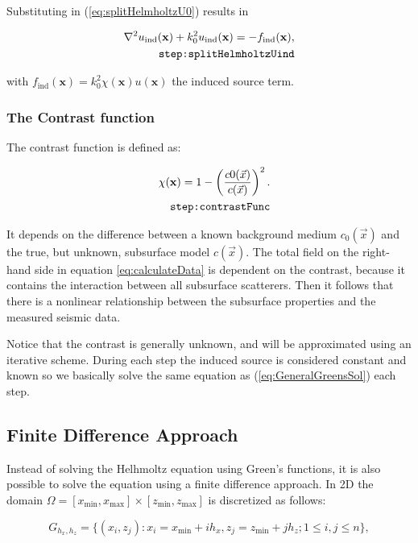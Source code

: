 \documentclass[10pt,a4paper]{article}
\begin{document}
Substituting in (\ref{eq:splitHelmholtzU0}) results in

\begin{align} \label{eq:splitHelmholtzUind}
\nabla^2 u_\text{ind}(\mathbf{x}) + k_0^2 u_\text{ind}(\mathbf{x}) =
-f_\text{ind}(\mathbf{x}),\\
\tag*{\texttt{step:splitHelmholtzUind}}
\end{align}

with $f_\text{ind}(\mathbf{x}) = k_0^2 \chi(\mathbf{x}) u(\mathbf{x})$
the induced source term.

\subsubsection{The Contrast function}
The contrast function is defined as:

\begin{align} \label{eq:contrastFunc}\chi(\mathbf{x}) = 1 -
\left(\frac{c0(\vec{x})}{c(\vec{x})} \right)^2.\\
\tag*{\texttt{step:contrastFunc}}
\end{align}

It depends on the difference between a known background medium
$c_\text{0}(\vec{x})$ and the true, but unknown, subsurface model
$c(\vec{x})$. The total field on the right-hand side in equation
\ref{eq:calculateData} is dependent on the contrast, because it contains the
interaction between all subsurface scatterers. Then it follows that
there is a nonlinear relationship between the subsurface properties
and the measured seismic data.

Notice that the contrast is generally unknown, and will be
approximated using an iterative scheme. During each step the induced
source is considered constant and known so we basically solve the same
equation as (\ref{eq:GeneralGreensSol}) each step.

\subsection{Finite Difference Approach}
Instead of solving the Helhmoltz equation using Green's functions, it is also possible to solve the equation using a finite difference approach. In 2D the domain $\Omega=[x_{\min},x_{\max}]\times [z_{\min},z_{\max}]$ is discretized as follows:

\begin{equation}
G_{h_x,h_z} = \{(x_i,z_j): x_i = x_{\min}+ ih_x, z_j=z_{\min}+jh_z; 1\leq i,j\leq n\},
\end{equation} 
\end{document}
